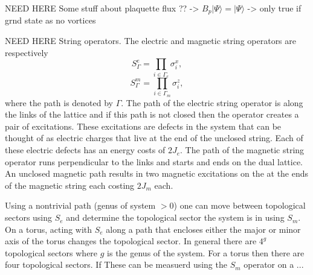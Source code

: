 \documentclass[aps,floatfix,11pt,twocolumn]{revtex4-1}
\begin{document}
    NEED HERE Some stuff about plaquette flux ?? -> $B_p | \Psi \rangle = | \Psi \rangle$ -> only true if
    grnd state as no vortices

    NEED HERE String operators. The electric and magnetic string operators are respectively
    \begin{equation}
        S^e_{\Gamma} = \prod_{i\in\Gamma_e} \sigma^x_i
        ,
    \end{equation}
    \begin{equation}
        S^m_{\Gamma} = \prod_{i\in\Gamma_m} \sigma^z_i
        ,
    \end{equation}
    where the path is denoted by $\Gamma$. The path of the electric string operator is along the
    links of the lattice and if this path is not closed then the operator
    creates a pair of excitations. These excitations are defects in the system 
    that can be thought of as electric charges that live at the
    end of the unclosed string. Each of these electric defects has an energy costs of $2J_e$. 
    The path of the magnetic string operator runs perpendicular to the links
    and starts and ends on the dual lattice. An unclosed magnetic path results in two magnetic
    excitations on the at the ends of the magnetic string each costing $2J_m$ each. 

    Using a nontrivial path (genus of system $>0$) one can move between topological sectors using $S_e$ and determine
    the topological sector the system is in using $S_m$. On a torus, acting with $S_e$ along a
    path that encloses either the major or minor axis of the torus changes the topological sector.
    In general there are $4^g$ topological sectors where $g$ is the
    genus of the system. For a torus then there are four topological sectors. If These can be
    measuerd using the $S_m$ operator on a ...
\end{document}
